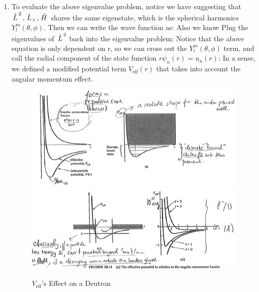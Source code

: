 \documentclass{school-22.101-notes}
\begin{document}
\begin{enumerate}
\item To evaluate the above eigenvalue problem, notice we have
suggesting that $\left. \hat{L} \right.^2, \left. \hat{L} \right._z, \left. \hat{H} \right.$ shares the same eigenstate, which is the spherical harmonics $Y_l^m (\theta, \phi)$. Then we can write the wave function as: 
Also we know 
Plug the eigenvalues of $\left. \hat{L} \right.^2$ back into the eigenvalue problem: 
Notice that the above equation is only dependent on r, so we can cross out the $Y_l^m (\theta, \phi)$ term, and call the radial component of the state function $r \psi_n (r) = u_n (r)$: 
In a sense, we defined a modified potential term $V_{\mathrm{eff}} (r)$ that takes into account the angular momentum effect.  
\begin{figure}
    \centering
    \includegraphics[width=4.5in]{images/deuteron/deutrium-V-eff.png}
    \\
    \includegraphics[width=4.5in]{images/deuteron/deutrium-V-eff-2.png}    
    \caption{$V_{\mathrm{eff}}$'s Effect on a Deutron}
    \label{V-eff}

\end{figure}
\end{enumerate}
\end{document}

